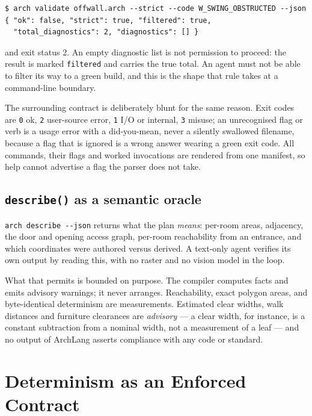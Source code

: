 \documentclass[10pt,conference]{IEEEtran}
\begin{document}
\begin{lstlisting}[language={},basicstyle=\ttfamily\scriptsize]
$ arch validate offwall.arch --strict --code W_SWING_OBSTRUCTED --json
{ "ok": false, "strict": true, "filtered": true,
  "total_diagnostics": 2, "diagnostics": [] }
\end{lstlisting}

\noindent and exit status 2. An empty diagnostic list is not permission to proceed:
the result is marked \texttt{filtered} and carries the true total. An agent must not
be able to filter its way to a green build, and this is the shape that rule takes at
a command-line boundary.

The surrounding contract is deliberately blunt for the same reason. Exit codes are
\texttt{0} ok, \texttt{2} user-source error, \texttt{1} I/O or internal, \texttt{3}
misuse; an unrecognised flag or verb is a usage error with a did-you-mean, never a
silently swallowed filename, because a flag that is ignored is a wrong answer wearing
a green exit code. All \factCliCommands{} commands, their \factCliFlags{} flags and
\factCliExamples{} worked invocations are rendered from one manifest, so help cannot
advertise a flag the parser does not take.

\subsection{\texttt{describe()} as a semantic oracle}
\texttt{arch describe -{}-json} returns what the plan \emph{means}: per-room areas,
adjacency, the door and opening access graph, per-room reachability from an entrance,
and which coordinates were authored versus derived. A text-only agent verifies its own
output by reading this, with no raster and no vision model in the loop.

What that permits is bounded on purpose. The compiler computes facts and emits
advisory warnings; it never arranges. Reachability, exact polygon areas, and
byte-identical determinism are measurements. Estimated clear widths, walk distances
and furniture clearances are \emph{advisory} --- a clear width, for instance, is a
constant subtraction from a nominal width, not a measurement of a leaf --- and no
output of ArchLang asserts compliance with any code or standard.

\section{Determinism as an Enforced Contract}
\end{document}
